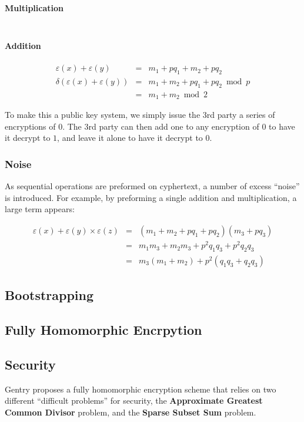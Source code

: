 \documentclass[a4paper,10pt]{article}
\begin{document}
\paragraph{Multiplication}
\begin{eqnarray*}
\end{eqnarray*}

\paragraph{Addition}
\begin{eqnarray*}
\varepsilon(x) + \varepsilon(y) &=& m_1 + p q_1 + m_2 + p q_2\\
\delta(\varepsilon(x) + \varepsilon(y))&=& m_1 + m_2 + pq_1 + pq_2 \bmod p\\
&=& m_1 + m_2 \bmod 2
\end{eqnarray*}

To make this a public key system, we simply issue the 3rd party a
series of encryptions of $0$. The 3rd party can then add one to any
encryption of $0$ to have it decrypt to $1$, and leave it alone to
have it decrypt to $0$.

\subsubsection{Noise}
As sequential operations are preformed on cyphertext, a number of
excess ``noise'' is introduced. For example, by preforming a single
addition and multiplication, a large term appears:

\begin{eqnarray*}
\varepsilon(x) + \varepsilon(y) \times \varepsilon(z) &=& (m_1 + m_2 + pq_1 + pq_2)(m_3 + pq_3)\\
&=&m_1m_3 + m_2m_3 + p^2q_1q_3 + p^2q_2q_3\\
&=&m_3(m_1 + m_2) + p^2(q_1q_3 + q_2q_3)
\end{eqnarray*}

\subsection{Bootstrapping}

\subsection{Fully Homomorphic Encrpytion}

\subsection{Security}
Gentry proposes a fully homomorphic encryption scheme that relies on
two different ``difficult problems'' for security, the
\textbf{Approximate Greatest Common Divisor} problem, and the
\textbf{Sparse Subset Sum} problem.
\end{document}
